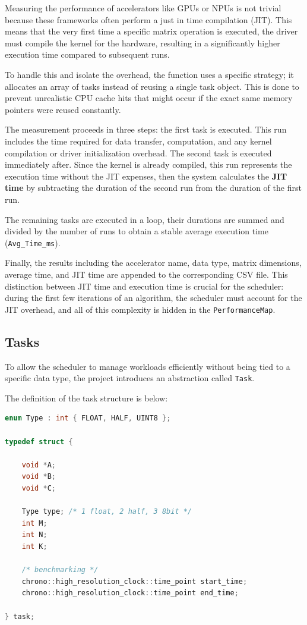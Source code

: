 Measuring the performance of accelerators like GPUs or NPUs is not trivial because these frameworks often perform a just in time compilation (JIT). This means that the very first time a specific matrix operation is executed, the driver must compile the kernel for the hardware, resulting in a significantly higher execution time compared to subsequent runs.

To handle this and isolate the overhead, the function uses a specific strategy; it allocates an array of tasks instead of reusing a single task object. This is done to prevent unrealistic CPU cache hits that might occur if the exact same memory pointers were reused constantly.

The measurement proceeds in three steps: the first task is executed. This run includes the time required for data transfer, computation, and any kernel compilation or driver initialization overhead. The second task is executed immediately after. Since the kernel is already compiled, this run represents the execution time without the JIT expenses, then the system calculates the \textbf{JIT time} by subtracting the duration of the second run from the duration of the first run. 
    
The remaining tasks are executed in a loop, their durations are summed and divided by the number of runs to obtain a stable average execution time (\texttt{Avg\_Time\_ms}). 

Finally, the results including the accelerator name, data type, matrix dimensions, average time, and JIT time are appended to the corresponding CSV file. This distinction between JIT time and execution time is crucial for the scheduler: during the first few iterations of an algorithm, the scheduler must account for the JIT overhead, and all of this complexity is hidden in the \texttt{PerformanceMap}. 

\clearpage 

\subsection{Tasks}
\label{impltask}
To allow the scheduler to manage workloads efficiently without being tied to a specific data type, the project introduces an  abstraction called \texttt{Task}.

The definition of the task structure is below: 

\begin{lstlisting}[caption={Task Structure}, language=C++] 
enum Type : int { FLOAT, HALF, UINT8 };

typedef struct { 

    void *A; 
    void *B; 
    void *C;
    
    Type type; /* 1 float, 2 half, 3 8bit */
    int M; 
    int N; 
    int K; 
    
    /* benchmarking */
    chrono::high_resolution_clock::time_point start_time;
    chrono::high_resolution_clock::time_point end_time;

} task; 
\end{lstlisting}


